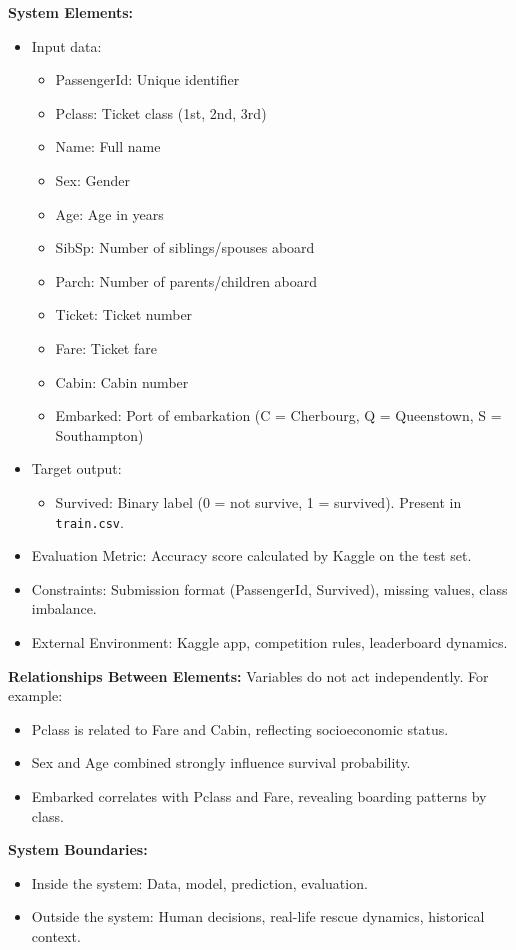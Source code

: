 \documentclass[12pt]{report}
\begin{document}
\textbf{System Elements:}
\begin{itemize}
    \item Input data:
    \begin{itemize}
        \item PassengerId: Unique identifier
        \item Pclass: Ticket class (1st, 2nd, 3rd)
        \item Name: Full name
        \item Sex: Gender
        \item Age: Age in years
        \item SibSp: Number of siblings/spouses aboard
        \item Parch: Number of parents/children aboard
        \item Ticket: Ticket number
        \item Fare: Ticket fare
        \item Cabin: Cabin number
        \item Embarked: Port of embarkation (C = Cherbourg, Q = Queenstown, S = Southampton)
    \end{itemize}
    \item Target output:
    \begin{itemize}
        \item Survived: Binary label (0 = not survive, 1 = survived). Present in \texttt{train.csv}.
    \end{itemize}
    \item Evaluation Metric: Accuracy score calculated by Kaggle on the test set.
    \item Constraints: Submission format (PassengerId, Survived), missing values, class imbalance.
    \item External Environment: Kaggle app, competition rules, leaderboard dynamics.
\end{itemize}

\textbf{Relationships Between Elements:}
Variables do not act independently. For example:
\begin{itemize}
    \item Pclass is related to Fare and Cabin, reflecting socioeconomic status.
    \item Sex and Age combined strongly influence survival probability.
    \item Embarked correlates with Pclass and Fare, revealing boarding patterns by class.
\end{itemize}

\textbf{System Boundaries:}
\begin{itemize}
    \item Inside the system: Data, model, prediction, evaluation.
    \item Outside the system: Human decisions, real-life rescue dynamics, historical context.
\end{itemize}
\end{document}

